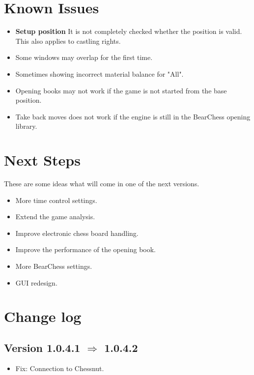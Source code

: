\documentclass[11pt,a4paper]{article}
\begin{document}
\section{Known Issues}
\begin{itemize}
    \item \textbf{Setup position} It is not completely checked whether the position is valid. This also applies to castling rights.
	\item Some windows may overlap for the first time.
	\item Sometimes showing incorrect material balance for "All".
	\item Opening books may not work if the game is not started from the base position.	
	\item Take back moves does not work if the engine is still in the BearChess opening library.
\end{itemize}



\section{Next Steps}

These are some ideas what will come in one of the next versions.

\begin{itemize}		
	    \item More time control settings.
		\item Extend the game analysis.
		\item Improve electronic chess board handling.
  	    \item Improve the performance of the opening book.
    	\item More BearChess settings.
   		\item GUI redesign.
\end{itemize} 

\pagebreak

\listoffigures

\pagebreak

\section{Change log}

\subsection*{Version 1.0.4.1 $\Rightarrow$  1.0.4.2}
\begin{itemize}		
	\item {\color{red}Fix}: Connection to Chessnut.	
\end{itemize}
\end{document}
